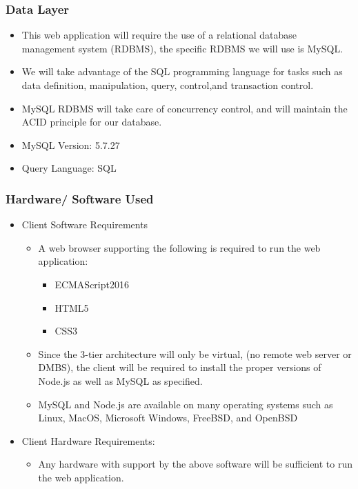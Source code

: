\documentclass[letter, 12pt, titlepage]{article}
\begin{document}
		\subsubsection{Data Layer}
		
			\begin{itemize}
			
			\item	This web application will require the use of a relational database management system (RDBMS), the specific RDBMS we will use is  MySQL.
			\item We will take advantage of the SQL programming language for tasks such as data definition, manipulation, query, control,and transaction control.
			\item MySQL RDBMS will take care of concurrency control, and will maintain the ACID principle for our database. 
			\item MySQL Version: 5.7.27
			\item Query Language: SQL
			\end{itemize}
		\subsubsection{Hardware/ Software Used}
		
		\begin{itemize}

			\item Client Software Requirements
			\begin{itemize}
				\item A web browser supporting the following is required to run the web application:
					\begin{itemize}
						\item ECMAScript2016
						\item HTML5
						\item CSS3
					\end{itemize}
			\item Since the 3-tier architecture will only be virtual, (no remote web server or DMBS), the client will be required to install the proper versions of Node.js as well as MySQL as specified. 
			
			\item  MySQL and Node.js are available on many operating systems such as Linux, MacOS, Microsoft Windows, FreeBSD, and OpenBSD	
			\end{itemize}

		\item Client Hardware Requirements:
			\begin{itemize}	
				\item Any hardware with support by the above software will be sufficient to run the web application.
			\end{itemize}
		\end{itemize}
\end{document}
